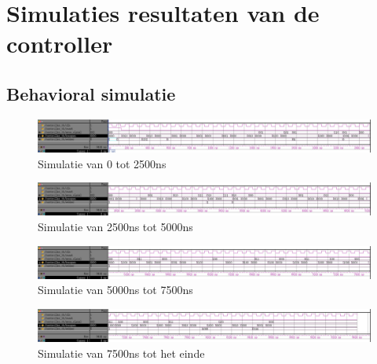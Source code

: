 \chapter[Simulatie resultaten]{Simulaties resultaten van de controller}
\label{Ap:sim_controller}
\section{Behavioral simulatie}
\begin{figure}[ht!]
\includegraphics[width=\textwidth,height=\textheight,keepaspectratio]{Figuren/Controller/wave0-2_5_inv.jpg}
\caption{Simulatie van 0 tot 2500ns}
\label{fig:sim_beh_0-2_5}
\end{figure}
\begin{figure}[ht!]
\includegraphics[width=\textwidth,height=\textheight,keepaspectratio]{Figuren/Controller/wave2_5-5_inv.jpg}
\caption{Simulatie van 2500ns tot 5000ns}
\label{fig:sim_beh_2_5-5}
\end{figure}
\begin{figure}[ht!]
\includegraphics[width=\textwidth,height=\textheight,keepaspectratio]{Figuren/Controller/wave5-7_5_inv.jpg}
\caption{Simulatie van 5000ns tot 7500ns}
\label{fig:sim_beh_5-7_5}
\end{figure}
\begin{figure}[ht!]
\includegraphics[width=\textwidth,height=\textheight,keepaspectratio]{Figuren/Controller/wave7_5-_inv.jpg}
\caption{Simulatie van 7500ns tot het einde}
\label{fig:sim_beh_7_5-}
\end{figure}
\newpage
